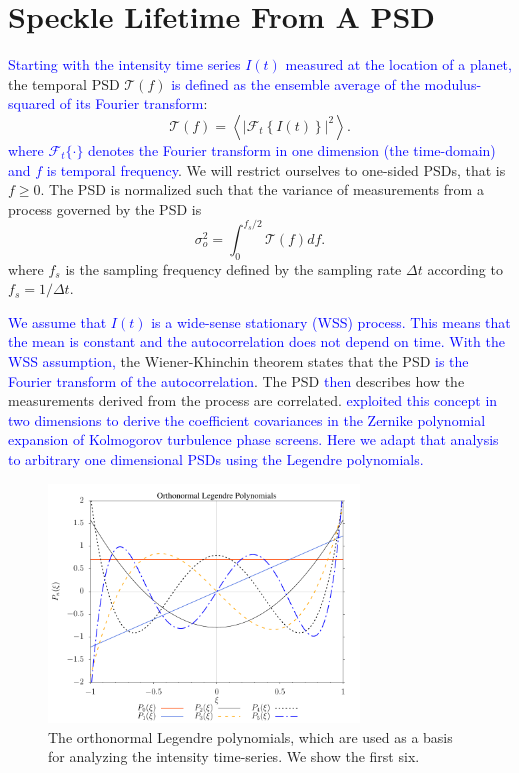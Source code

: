 \documentclass[10pt,preprint]{aastex631}
\newcommand{\jrmadd}[1]{\textcolor{blue}{#1}}
\begin{document}
\section{Speckle Lifetime From A PSD}
\label{sec:psd_lifetime}
\jrmadd{Starting with the intensity time series $I(t)$ measured at the location of a planet,} the temporal PSD $\mathcal{T}(f)$ \jrmadd{is defined as the ensemble average of the modulus-squared of its Fourier transform}:
\begin{equation}
\mathcal{T}(f) = \left\langle \left| \mathcal{F}_t \left\{ I(t) \right\} \right|^2 \right\rangle.
\label{eqn:psd_def}
\end{equation}
\jrmadd{where $\mathcal{F}_t\{\cdot\}$ denotes the Fourier transform in one dimension (the time-domain) and $f$ is temporal frequency}.  We will restrict ourselves to one-sided PSDs, that is $f \ge 0$.  The PSD is normalized such that the variance of measurements from a process governed by the PSD is
\begin{equation}
\sigma_o^2 = \int_{0}^{f_s/2} \mathcal{T}(f) df.
\label{eqn:process_var}
\end{equation}
where $f_s$ is the sampling frequency defined by the sampling rate $\Delta t$ according to $f_s = 1/\Delta t$.

\jrmadd{We assume that $I(t)$ is a wide-sense stationary (WSS) process.  This means that the mean is constant and the autocorrelation does not depend on time.  With the WSS assumption,} the Wiener-Khinchin theorem states that the PSD \jrmadd{is the Fourier transform of the autocorrelation}.  The PSD \jrmadd{then} describes how the measurements derived from the process are correlated. \jrmadd{\citet{1976JOSA...66..207N} exploited this concept in two dimensions to derive the coefficient covariances in the Zernike polynomial expansion of Kolmogorov turbulence phase screens.  Here we adapt that analysis to arbitrary one dimensional PSDs using the Legendre polynomials.}  

\begin{figure}[h]
    \centering
    \includegraphics[width=3.25in]{onLegPol.pdf}
    \caption{The orthonormal Legendre polynomials, which are used as a basis for analyzing the intensity time-series.  We show the first six. \label{fig:onlegpol}}
\end{figure}
\end{document}
